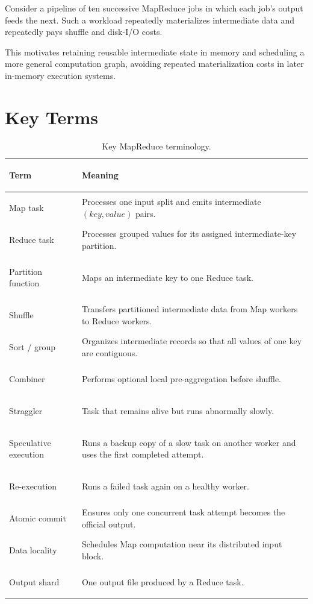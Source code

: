 \documentclass[11pt,a4paper,oneside]{book}
\begin{document}
Consider a pipeline of ten successive MapReduce jobs in which each job's output feeds the next. Such a workload repeatedly materializes intermediate data and repeatedly pays shuffle and disk-I/O costs.

This motivates retaining reusable intermediate state in memory and scheduling a more general computation graph, avoiding repeated materialization costs in later in-memory execution systems.

\section{Key Terms}

\begin{table}[htbp]
\centering
\caption{Key MapReduce terminology.}
\label{tab:mapreduce-key-terms}
\begin{tabularx}{\textwidth}{>{\bfseries\raggedright\arraybackslash}p{4.1cm} Y}
\toprule
Term & Meaning \\
\midrule
Map task & Processes one input split and emits intermediate \((key,value)\) pairs. \\
Reduce task & Processes grouped values for its assigned intermediate-key partition. \\
Partition function & Maps an intermediate key to one Reduce task. \\
Shuffle & Transfers partitioned intermediate data from Map workers to Reduce workers. \\
Sort / group & Organizes intermediate records so that all values of one key are contiguous. \\
Combiner & Performs optional local pre-aggregation before shuffle. \\
Straggler & Task that remains alive but runs abnormally slowly. \\
Speculative execution & Runs a backup copy of a slow task on another worker and uses the first completed attempt. \\
Re-execution & Runs a failed task again on a healthy worker. \\
Atomic commit & Ensures only one concurrent task attempt becomes the official output. \\
Data locality & Schedules Map computation near its distributed input block. \\
Output shard & One output file produced by a Reduce task. \\
\bottomrule
\end{tabularx}
\end{table}
\end{document}
